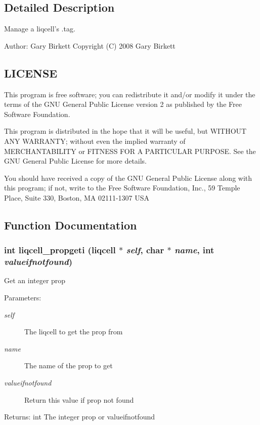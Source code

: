\label{_details}
\subsection{Detailed Description}
Manage a liqcell's .tag. 

\begin{Desc}
\item[Author:]Gary Birkett Copyright (C) 2008 Gary Birkett\end{Desc}
\subsection{LICENSE}\label{de/d77/liqui_8c_LICENSE}
This program is free software; you can redistribute it and/or modify it under the terms of the GNU General Public License version 2 as published by the Free Software Foundation.

This program is distributed in the hope that it will be useful, but WITHOUT ANY WARRANTY; without even the implied warranty of MERCHANTABILITY or FITNESS FOR A PARTICULAR PURPOSE. See the GNU General Public License for more details.

You should have received a copy of the GNU General Public License along with this program; if not, write to the Free Software Foundation, Inc., 59 Temple Place, Suite 330, Boston, MA 02111-1307 USA 

\subsection{Function Documentation}
\subsubsection[{liqcell\_\-propgeti}]{\setlength{\rightskip}{0pt plus 5cm}int liqcell\_\-propgeti (liqcell $\ast$ {\em self}, \/  char $\ast$ {\em name}, \/  int {\em valueifnotfound})}\label{d7/db4/liqcell__prop_8c_d95b04d386b49c246a1f95105092cbd1}


Get an integer prop \begin{Desc}
\item[Parameters:]
\begin{description}
\item[{\em self}]The liqcell to get the prop from \item[{\em name}]The name of the prop to get \item[{\em valueifnotfound}]Return this value if prop not found \end{description}
\end{Desc}
\begin{Desc}
\item[Returns:]int The integer prop or valueifnotfound \end{Desc}
